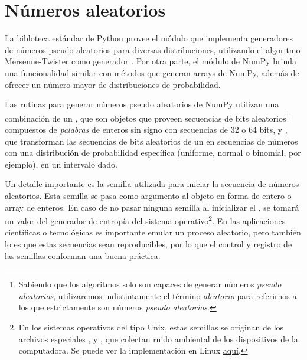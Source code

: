 \section{Números aleatorios}

La bibloteca estándar de Python provee el módulo  que implementa generadores de números pseudo aleatorios para diversas distribuciones, utilizando el algoritmo Mersenne-Twister como generador \citep{matsumoto1998}. Por otra parte, el módulo  de NumPy brinda una funcionalidad similar con métodos que generan arrays de NumPy, además de ofrecer un número mayor de distribuciones de probabilidad.

Las rutinas para generar números pseudo aleatorios de NumPy utilizan una combinación de un , que son objetos que proveen secuencias de bits aleatorios\footnote{Sabiendo que los algoritmos solo son capaces de generar números  \textit{pseudo aleatorios}, utilizaremos indistintamente el término \textit{aleatorio} para referirnos a los que estrictamente son números \textit{pseudo aleatorios}.} compuestos de \textit{palabras} de enteros sin signo con secuencias de 32 o 64 bits, y , que transforman las secuencias de bits aleatorios de un  en secuencias de números con una distribución de probabilidad específica (uniforme, normal o binomial, por ejemplo), en un intervalo dado. 

Un detalle importante es la semilla utilizada para iniciar la secuencia de números aleatorios. Esta semilla se pasa como argumento al objeto  en forma de entero o array de enteros. En caso de no pasar ninguna semilla al inicializar el , se tomará un valor del generador de entropía del sistema operativo\footnote{En los sistemas operativos del tipo Unix, estas semillas se originan de los archivos especiales ,  y , que colectan ruido ambiental de los dispositivos de la computadora. Se puede ver la implementación en Linux \href{https://git.kernel.org/pub/scm/linux/kernel/git/stable/linux.git/tree/drivers/char/random.c?id=refs/tags/v3.15.6\#n52}{aquí}.}. En las aplicaciones científicas o tecnológicas es importante emular un proceso aleatorio, pero también lo es que estas secuencias sean reproducibles, por lo que el control y registro de las semillas conforman una buena práctica.

